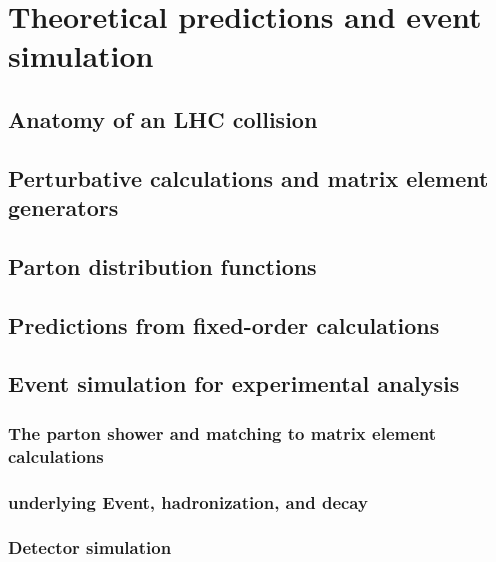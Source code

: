 \chapter{Theoretical predictions and event simulation}
\section{Anatomy of an LHC collision}
\section{Perturbative calculations and matrix element generators}
\section{Parton distribution functions}
\section{Predictions from fixed-order calculations}
\section{Event simulation for experimental analysis}
  \subsection{The parton shower and matching to matrix element calculations}
  \subsection{underlying Event, hadronization, and decay}
  \subsection{Detector simulation}

